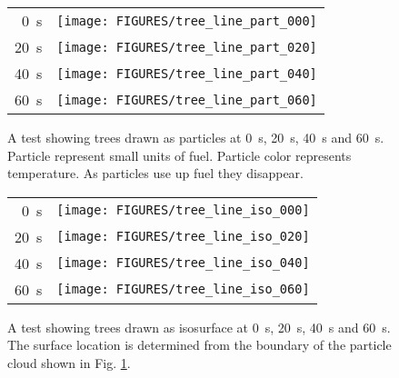 \begin{figure}[\figoptions]
\begin{center}
\begin{tabular}{rc}
 \SI{0}{s}&\texttt{[image: FIGURES/tree\_line\_part\_000]}\\
 \SI{20}{s}&\texttt{[image: FIGURES/tree\_line\_part\_020]}\\
 \SI{40}{s}&\texttt{[image: FIGURES/tree\_line\_part\_040]}\\
 \SI{60}{s}&\texttt{[image: FIGURES/tree\_line\_part\_060]}
 \end{tabular}
\end{center}
 \caption[A test showing trees drawn as particles.]
 {A test showing trees drawn as particles at \SI{0}{s}, \SI{20}{s}, \SI{40}{s} and \SI{60}{s}.  Particle represent small units of fuel.  Particle color represents temperature.  As particles use up fuel they disappear.}
\label{figWUIparts}%
\end{figure}

\begin{figure}[\figoptions]
\begin{center}
\begin{tabular}{rc}
 \SI{0}{s}&\texttt{[image: FIGURES/tree\_line\_iso\_000]}\\
 \SI{20}{s}&\texttt{[image: FIGURES/tree\_line\_iso\_020]}\\
 \SI{40}{s}&\texttt{[image: FIGURES/tree\_line\_iso\_040]}\\
 \SI{60}{s}&\texttt{[image: FIGURES/tree\_line\_iso\_060]}
 \end{tabular}
\end{center}
 \caption[A test showing trees drawn as isosurfaces.]
 {A test showing trees drawn as isosurface  at \SI{0}{s}, \SI{20}{s}, \SI{40}{s} and \SI{60}{s}.  The surface location  is determined from the boundary of the  particle cloud shown in Fig. \ref{figWUIparts}.}
\label{figWUIiso}%
\end{figure}
\npage
